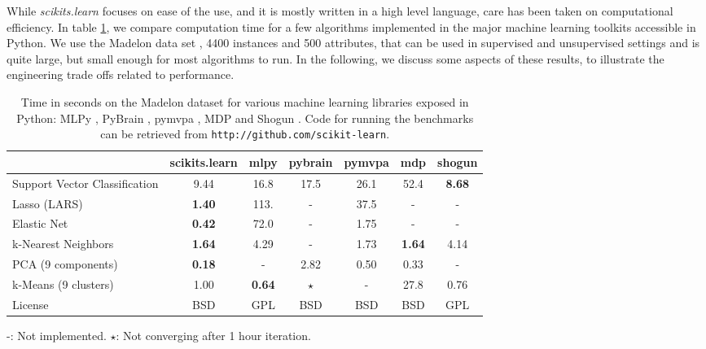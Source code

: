 \documentclass[twoside,11pt]{article}
\begin{document}

While \emph{scikits.learn} focuses on ease of the use, and it is
mostly written in a high level language, care has been taken on
computational efficiency. In table \ref{tab:comparisons}, we compare
computation time for a few algorithms implemented in the major machine
learning toolkits accessible in Python. We use the Madelon data
set \citep{Guyon2004}, 4400 instances and 500 attributes,
that can be used in supervised
and unsupervised settings and is quite large, but small enough for most
algorithms to run.
%
%
In the following, we discuss some aspects of these results, to illustrate
the engineering trade offs related to performance. 

\begin{table}[t]
\small
\hspace*{.03\linewidth}%
\begin{tabular}{l c c c c c c}
\hline\hline %
 & scikits.learn & mlpy & pybrain & pymvpa &  mdp & shogun \\ [0.5ex]
\hline
Support Vector Classification & 9.44 & 16.8 & 17.5 & 26.1 & 52.4 & {\bf 8.68} \\
Lasso (LARS) & {\bf 1.40} & 113.   & - &  37.5 & - & - \\
Elastic Net & {\bf 0.42} & 72.0 & -  &  1.75  & -  & - \\
k-Nearest Neighbors & {\bf 1.64} & 4.29 & - &  1.73 & {\bf 1.64} & 4.14 \\
PCA (9 components) & {\bf 0.18} & - & 2.82  & 0.50 & 0.33  & - \\
k-Means (9 clusters) & 1.00 &  {\bf 0.64} & $\star$ & -  & 27.8 & 0.76 \\
License &  BSD & GPL & BSD  &  BSD  & BSD  & GPL \\
\hline
\end{tabular}

-: Not implemented. \hfill
$\star$: Not converging after 1 hour iteration.

\vspace*{-1.5ex}
\caption{\small
Time in seconds on the Madelon dataset for various machine learning libraries exposed in Python:
MLPy \citep{albanese2008}, PyBrain \citep{schaul2010}, pymvpa
\citep{hanke2009}, MDP \citep{zito2008} and Shogun
\citep{sonnenburg2010}. Code for running the
benchmarks can be retrieved from {\tt http://github.com/scikit-learn}.
\vspace*{-1.5em}\label{tab:comparisons}
}
\end{table}
\end{document}
